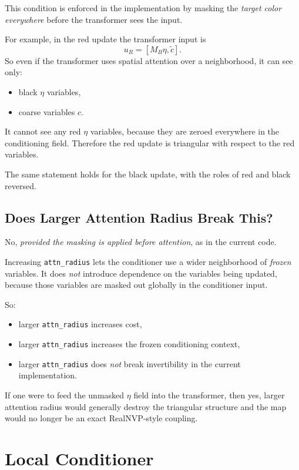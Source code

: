 \documentclass[11pt]{article}
\begin{document}
This condition is enforced in the implementation by masking the \emph{target
color everywhere} before the transformer sees the input.

For example, in the red update the transformer input is
\[
u_R = [M_B\eta,\tilde c].
\]
So even if the transformer uses spatial attention over a neighborhood, it can
see only:
\begin{itemize}
\item black $\eta$ variables,
\item coarse variables $c$.
\end{itemize}
It cannot see any red $\eta$ variables, because they are zeroed everywhere in
the conditioning field. Therefore the red update is triangular with respect to
the red variables.

The same statement holds for the black update, with the roles of red and black
reversed.

\subsection{Does Larger Attention Radius Break This?}

No, \emph{provided the masking is applied before attention}, as in the current
code.

Increasing \texttt{attn\_radius} lets the conditioner use a wider neighborhood
of \emph{frozen} variables. It does \emph{not} introduce dependence on the
variables being updated, because those variables are masked out globally in the
conditioner input.

So:
\begin{itemize}
\item larger \texttt{attn\_radius} increases cost,
\item larger \texttt{attn\_radius} increases the frozen conditioning context,
\item larger \texttt{attn\_radius} does \emph{not} break invertibility in the
current implementation.
\end{itemize}

If one were to feed the unmasked $\eta$ field into the transformer, then yes,
larger attention radius would generally destroy the triangular structure and the
map would no longer be an exact RealNVP-style coupling.

\section{Local Conditioner}
\end{document}
